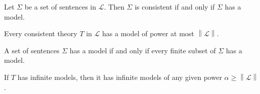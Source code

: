 \documentclass[../../main.tex]{subfiles}
\begin{document}
\begin{theorem}\cite[Theorem 1.3.21]{Cha90}
    Let $\Sigma$ be a set of sentences in $\mathcal{L}$.
    Then $\Sigma$ is consistent if and only if $\Sigma$ has a model.
\end{theorem}

\begin{theorem}\label{down-lowenheim-skolem}\cite[Corollary 2.1.4]{Cha90}
    Every consistent theory $T$ in $\mathcal{L}$ has a model of power at most $\left\lVert \mathcal{L} \right\rVert$.
\end{theorem}

\begin{theorem}\cite[Theorem 1.3.22]{Cha90}
    A set of sentences $\Sigma$ has a model if and only if every finite subset of $\Sigma$ has a model.
\end{theorem}

\begin{theorem}\label{up-lowenheim-skolem}\cite[Corollary 2.1.6]{Cha90}
    If $T$ has infinite models, then it has infinite models of any given power $\alpha \geq \left\lVert \mathcal{L} \right\rVert$.
\end{theorem}
\end{document}
